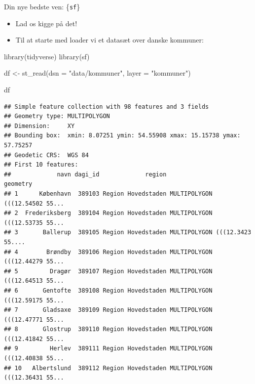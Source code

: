 \documentclass[
  8pt,
  ignorenonframetext,
  aspectratio=169]{beamer}
\newenvironment{Shaded}{}{}
\newcommand{\AttributeTok}[1]{\textcolor[rgb]{0.49,0.56,0.16}{#1}}
\newcommand{\FunctionTok}[1]{\textcolor[rgb]{0.02,0.16,0.49}{#1}}
\newcommand{\NormalTok}[1]{#1}
\newcommand{\OtherTok}[1]{\textcolor[rgb]{0.00,0.44,0.13}{#1}}
\newcommand{\StringTok}[1]{\textcolor[rgb]{0.25,0.44,0.63}{#1}}
\begin{document}
\begin{frame}[fragile]{Din nye bedste ven: \{\texttt{sf}\}}
\protect\hypertarget{din-nye-bedste-ven-sf}{}
\begin{itemize}
\item
  Lad os kigge på det!
\item
  Til at starte med loader vi et datasæt over danske kommuner:
\end{itemize}

\tiny

\begin{Shaded}
\begin{Highlighting}[]
\FunctionTok{library}\NormalTok{(tidyverse)}
\FunctionTok{library}\NormalTok{(sf)}

\NormalTok{df }\OtherTok{\textless{}{-}} \FunctionTok{st\_read}\NormalTok{(}\AttributeTok{dsn =} \StringTok{"data/kommuner"}\NormalTok{,}
              \AttributeTok{layer =} \StringTok{"kommuner"}\NormalTok{)}
\end{Highlighting}
\end{Shaded}

\normalsize

\tiny

\begin{Shaded}
\begin{Highlighting}[]
\NormalTok{df}
\end{Highlighting}
\end{Shaded}

\begin{verbatim}
## Simple feature collection with 98 features and 3 fields
## Geometry type: MULTIPOLYGON
## Dimension:     XY
## Bounding box:  xmin: 8.07251 ymin: 54.55908 xmax: 15.15738 ymax: 57.75257
## Geodetic CRS:  WGS 84
## First 10 features:
##             navn dagi_id             region                       geometry
## 1      København  389103 Region Hovedstaden MULTIPOLYGON (((12.54502 55...
## 2  Frederiksberg  389104 Region Hovedstaden MULTIPOLYGON (((12.53735 55...
## 3       Ballerup  389105 Region Hovedstaden MULTIPOLYGON (((12.3423 55....
## 4        Brøndby  389106 Region Hovedstaden MULTIPOLYGON (((12.44279 55...
## 5         Dragør  389107 Region Hovedstaden MULTIPOLYGON (((12.64513 55...
## 6       Gentofte  389108 Region Hovedstaden MULTIPOLYGON (((12.59175 55...
## 7       Gladsaxe  389109 Region Hovedstaden MULTIPOLYGON (((12.47771 55...
## 8       Glostrup  389110 Region Hovedstaden MULTIPOLYGON (((12.41842 55...
## 9         Herlev  389111 Region Hovedstaden MULTIPOLYGON (((12.40838 55...
## 10   Albertslund  389112 Region Hovedstaden MULTIPOLYGON (((12.36431 55...
\end{verbatim}

\normalsize
\end{frame}
\end{document}
